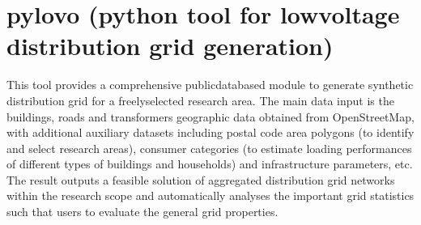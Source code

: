 \documentclass[letterpaper,10pt,english]{sphinxmanual}
\begin{document}
\chapter{pylovo (python tool for low\sphinxhyphen{}voltage distribution grid generation)}
\label{\detokenize{index:pylovo-python-tool-for-low-voltage-distribution-grid-generation}}
\sphinxAtStartPar
This tool provides a comprehensive public\sphinxhyphen{}data\sphinxhyphen{}based module to generate synthetic distribution grid for a
freely\sphinxhyphen{}selected research area. The main data input is the buildings, roads and transformers geographic data obtained
from OpenStreetMap, with additional auxiliary datasets including postal code area polygons (to identify and select
research areas), consumer categories (to estimate loading performances of different types of buildings and households)
and infrastructure parameters, etc. The result outputs a feasible solution of aggregated distribution grid networks
within the research scope and automatically analyses the important grid statistics such that users to evaluate the
general grid properties.
\end{document}
